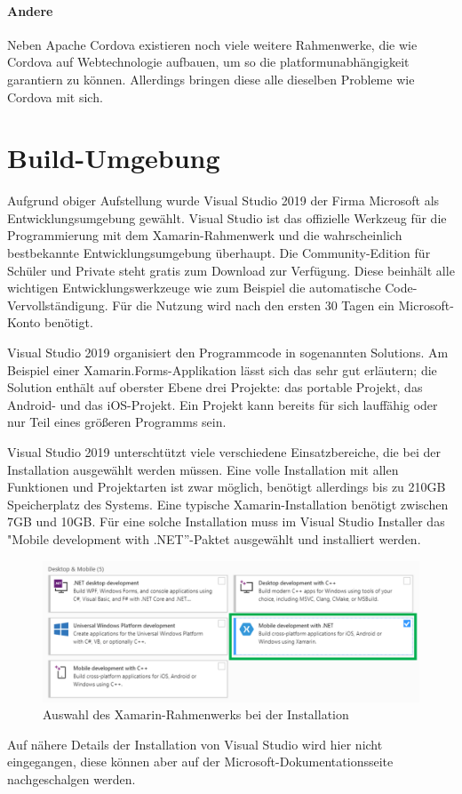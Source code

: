 \paragraph{Andere}
Neben Apache Cordova existieren noch viele weitere Rahmenwerke, die wie Cordova auf Webtechnologie aufbauen, um so die platformunabhängigkeit garantiern zu können. Allerdings bringen diese alle dieselben Probleme wie Cordova mit sich.

\section{Build-Umgebung}
Aufgrund obiger Aufstellung wurde Visual Studio 2019 der Firma Microsoft als Entwicklungsumgebung gewählt.
Visual Studio ist das offizielle Werkzeug für die Programmierung mit dem Xamarin-Rahmenwerk und die wahrscheinlich bestbekannte Entwicklungsumgebung überhaupt.
Die Community-Edition für Schüler und Private steht gratis zum Download zur Verfügung.
Diese beinhält alle wichtigen Entwicklungswerkzeuge wie zum Beispiel die automatische Code-Vervollständigung.
Für die Nutzung wird nach den ersten 30 Tagen ein Microsoft-Konto benötigt.\par

Visual Studio 2019 organisiert den Programmcode in sogenannten Solutions.
Am Beispiel einer Xamarin.Forms-Applikation lässt sich das sehr gut erläutern;
die Solution enthält auf oberster Ebene drei Projekte: das portable Projekt, das Android- und das iOS-Projekt.
Ein Projekt kann bereits für sich lauffähig oder nur Teil eines größeren Programms sein.\par

Visual Studio 2019 unterschtützt viele verschiedene Einsatzbereiche, die bei der Installation ausgewählt werden müssen.
Eine volle Installation mit allen Funktionen und Projektarten ist zwar möglich, benötigt allerdings bis zu 210GB Speicherplatz des Systems.
Eine typische Xamarin-Installation benötigt zwischen 7GB und 10GB.
Für eine solche Installation muss im Visual Studio Installer das "Mobile development with .NET''-Paktet ausgewählt und installiert werden.
\begin{figure}[H]
    \centering\includegraphics[width=0.9\linewidth]{images/auswahl_rahmenwerk/installation.png}    
    \caption{Auswahl des Xamarin-Rahmenwerks bei der Installation}
\end{figure}
Auf nähere Details der Installation von Visual Studio wird hier nicht eingegangen, diese können aber auf der Microsoft-Dokumentationsseite \cite{msdoc-vs-install} nachgeschalgen werden.
%
